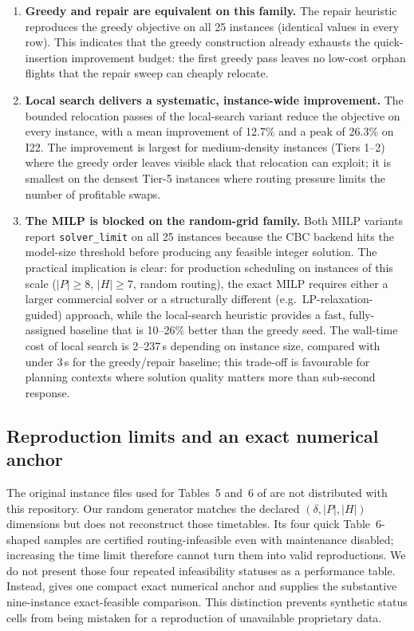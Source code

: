 \begin{enumerate}
  \item \textbf{Greedy and repair are equivalent on this family.}  The repair
    heuristic reproduces the greedy objective on all 25 instances
    (identical values in every row).  This indicates that the greedy
    construction already exhausts the quick-insertion improvement budget: the
    first greedy pass leaves no low-cost orphan flights that the repair sweep
    can cheaply relocate.

  \item \textbf{Local search delivers a systematic, instance-wide improvement.}
    The bounded relocation passes of the local-search variant reduce the
    objective on every instance, with a mean improvement of 12.7\% and a peak
    of 26.3\% on I22.  The improvement is largest for medium-density
    instances (Tiers 1--2) where the greedy order leaves visible slack that
    relocation can exploit; it is smallest on the densest Tier-5 instances
    where routing pressure limits the number of profitable swaps.

  \item \textbf{The MILP is blocked on the random-grid family.}  Both MILP
    variants report \texttt{solver\_limit} on all 25 instances because the
    CBC backend hits the model-size threshold before producing any feasible
    integer solution.  The practical implication is clear: for production
    scheduling on instances of this scale ($|P| \geq 8$, $|H| \geq 7$, random
    routing), the exact MILP requires either a larger commercial solver or
    a structurally different (e.g.\ LP-relaxation-guided) approach, while
    the local-search heuristic provides a fast, fully-assigned baseline that
    is 10--26\% better than the greedy seed.  The wall-time cost of local
    search is 2--237\,s depending on instance size, compared with under 3\,s
    for the greedy/repair baseline; this trade-off is favourable for
    planning contexts where solution quality matters more than sub-second
    response.
\end{enumerate}

\subsection{Reproduction limits and an exact numerical anchor}

The original instance files used for Tables~5 and~6 of
\citet{khaled2018compact} are not distributed with this repository.  Our
random generator matches the declared $(\delta,|P|,|H|)$ dimensions but does
not reconstruct those timetables.  Its four quick Table~6-shaped samples are
certified routing-infeasible even with maintenance disabled; increasing the
time limit therefore cannot turn them into valid reproductions.  We do not
present those four repeated infeasibility statuses as a performance table.
Instead,  gives one compact exact numerical anchor and
 supplies the substantive nine-instance
exact-feasible comparison.  This distinction prevents synthetic status cells
from being mistaken for a reproduction of unavailable proprietary data.

